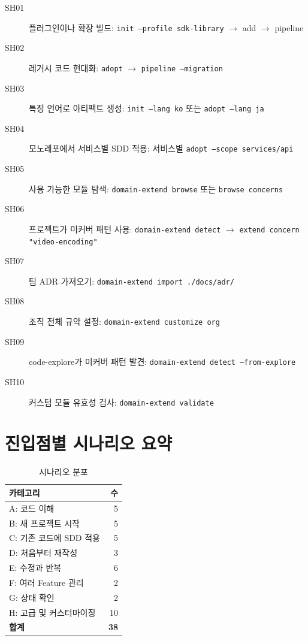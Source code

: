 \documentclass[11pt,a4paper,openright,twoside]{report}
\begin{document}
\begin{description}
  \item[SH01] 플러그인이나 확장 빌드: \texttt{init --profile sdk-library} $\rightarrow$ add $\rightarrow$ pipeline
  \item[SH02] 레거시 코드 현대화: \texttt{adopt} $\rightarrow$ \texttt{pipeline --migration}
  \item[SH03] 특정 언어로 아티팩트 생성: \texttt{init --lang ko} 또는 \texttt{adopt --lang ja}
  \item[SH04] 모노레포에서 서비스별 SDD 적용: 서비스별 \texttt{adopt --scope services/api}
  \item[SH05] 사용 가능한 모듈 탐색: \texttt{domain-extend browse} 또는 \texttt{browse concerns}
  \item[SH06] 프로젝트가 미커버 패턴 사용: \texttt{domain-extend detect} $\rightarrow$ \texttt{extend concern "video-encoding"}
  \item[SH07] 팀 ADR 가져오기: \texttt{domain-extend import ./docs/adr/}
  \item[SH08] 조직 전체 규약 설정: \texttt{domain-extend customize org}
  \item[SH09] code-explore가 미커버 패턴 발견: \texttt{domain-extend detect --from-explore}
  \item[SH10] 커스텀 모듈 유효성 검사: \texttt{domain-extend validate}
\end{description}

\section{진입점별 시나리오 요약}

\begin{table}[H]
\centering
\caption{시나리오 분포}
\label{tab:scenario-summary}
\begin{tabular}{lr}
\toprule
\textbf{카테고리} & \textbf{수} \\
\midrule
A: 코드 이해 & 5 \\
B: 새 프로젝트 시작 & 5 \\
C: 기존 코드에 SDD 적용 & 5 \\
D: 처음부터 재작성 & 3 \\
E: 수정과 반복 & 6 \\
F: 여러 Feature 관리 & 2 \\
G: 상태 확인 & 2 \\
H: 고급 및 커스터마이징 & 10 \\
\midrule
\textbf{합계} & \textbf{38} \\
\bottomrule
\end{tabular}
\end{table}
\end{document}
